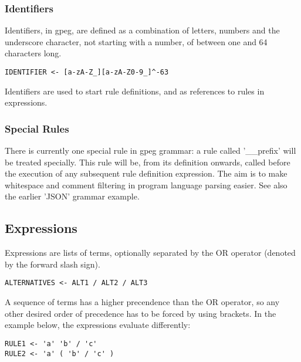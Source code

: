 \subsubsection{Identifiers}

Identifiers, in gpeg, are defined as a combination of letters,
numbers and the underscore character, not starting with a number,
of between one and 64 characters long.

\begin{myquote}
\begin{verbatim}
IDENTIFIER <- [a-zA-Z_][a-zA-Z0-9_]^-63
\end{verbatim}
\end{myquote}

Identifiers are used to start rule definitions, and as references
to rules in expressions.

\subsubsection{Special Rules}

There is currently one special rule in gpeg grammar: a rule called
'\_\_prefix' will be treated specially. This rule will be, from its
definition onwards, called before the execution of any subsequent rule
definition expression. The aim is to make whitespace and comment filtering
in program language parsing easier. See also the earlier 'JSON' grammar
example.

\subsection{Expressions}

Expressions are lists of terms, optionally separated by the
OR operator (denoted by the forward slash sign).

\begin{myquote}
\begin{verbatim}
ALTERNATIVES <- ALT1 / ALT2 / ALT3
\end{verbatim}
\end{myquote}

A sequence of terms has a higher precendence than the OR operator,
so any other desired order of precedence has to be forced by using
brackets.
In the example below, the expressions evaluate differently:

\begin{myquote}
\begin{verbatim}
RULE1 <- 'a' 'b' / 'c'
RULE2 <- 'a' ( 'b' / 'c' )
\end{verbatim}
\end{myquote}

